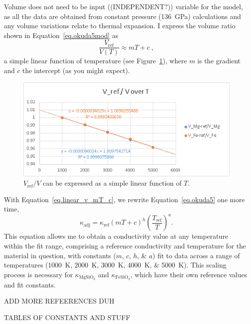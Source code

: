 Volume does not need to be input ((INDEPENDENT?)) variable for the model, as all the data are obtained from constant pressure (136~GPa) calculations and any volume variations relate to thermal expansion. I express the volume ratio shown in Equation~\ref{eq.okuda5mod} as 
%
\begin{equation}
\frac{V_{\mathrm{ref}}}{V(T)} \approx  mT+c \ ,
\label{eq.linear_v_mT_c}
\end{equation}
%
a simple linear function of temperature (see Figure~\ref{fig:draft_VrefV-T}), where $m$ is the gradient and $c$ the intercept (as you might expect). 

\begin{figure}[h!]
  \includegraphics[width=\linewidth]{Figures/draft_VrefV-T.png}
  \caption{$V_{\mathrm{ref}}/V$ can be expressed as a simple linear function of $T$.}
  \label{fig:draft_VrefV-T}
\end{figure}

With Equation~\ref{eq.linear_v_mT_c}, we rewrite Equation~\ref{eq.okuda5} one more time,
%
\begin{equation}
\kappa_{\mathrm{adj}}=\kappa_{\mathrm{ref}} \left ( mT+c \right )^{h} \left ( \frac{T_{\mathrm{ref}}}{T} \right )^{a}.
\label{eq.okuda5modmod}
\end{equation}
%
This equation allows me to obtain a conductivity value at any temperature within the fit range, comprising a reference conductivity and temperature for the material in question, with constants ($m$, $c$, $h$, \& $a$) fit to data across a range of temperatures (1000~K, 2000~K, 3000~K, 4000~K, \& 5000~K). This scaling process is necessary for $\kappa_{\mathrm{MgSiO_{3}}}$ and $\kappa_{\mathrm{FeSiO_{3}}}$, which have their own reference values and fit constants.

ADD MORE REFEERENCES DUH

TABLES OF CONSTANTS AND STUFF

